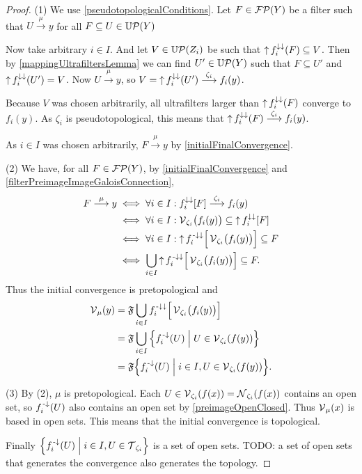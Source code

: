 \begin{proof}
(1) We use \ref{pseudotopologicalConditions}. Let $F\in\operatorname{\mathcal{FP}}(Y)$ be a filter such that $U\overset{\mu}{\longrightarrow} y$ for all $F\subseteq U\in\operatorname{\mathbb{U}\mathcal{P}}(Y)$ 

Now take arbitrary $i\in I$. And let $V\in\operatorname{\mathbb{U}\mathcal{P}}(Z_i)$ be such that $\operatorname{\uparrow} f_i^{\downarrow\downarrow}(F) \subseteq V$. Then by \ref{mappingUltrafiltersLemma} we can find $U'\in\operatorname{\mathbb{U}\mathcal{P}}(Y)$ such that $F\subseteq U'$ and $\operatorname{\uparrow} f_i^{\downarrow\downarrow}(U') = V$. Now $U\overset{\mu}{\longrightarrow} y$, so $V = \operatorname{\uparrow} f_i^{\downarrow\downarrow}(U') \overset{\zeta_i}{\longrightarrow} f_i(y)$. 

Because $V$ was chosen arbitrarily, all ultrafilters larger than $\operatorname{\uparrow} f_i^{\downarrow\downarrow}(F)$ converge to $f_i(y)$. As $\zeta_i$ is pseudotopological, this means that $\operatorname{\uparrow} f_i^{\downarrow\downarrow}(F) \overset{\zeta_i}{\longrightarrow} f_i(y)$.

As $i\in I$ was chosen arbitrarily, $F\overset{\mu}{\longrightarrow} y$ by \ref{initialFinalConvergence}.

(2) We have, for all $F\in \operatorname{\mathcal{FP}}(Y)$, by \ref{initialFinalConvergence} and \ref{filterPreimageImageGaloisConnection},
\begin{align*}
F \overset{\mu}{\longrightarrow} y &\iff \forall i\in I: f_i^{\downarrow\downarrow}[F] \overset{\zeta_i}{\longrightarrow} f_i(y) \\
&\iff \forall i\in I: \operatorname{\mathcal{V}}_{\zeta_i}\!\big(f_i(y)\big) \subseteq \operatorname{\uparrow} f_i^{\downarrow\downarrow}[F] \\
&\iff \forall i\in I: \operatorname{\uparrow} f_i^{{\text{\hspace{0.15em}-}\downarrow}\downarrow}\Big[\operatorname{\mathcal{V}}_{\zeta_i}\!\big(f_i(y)\big)\Big] \subseteq F \\
&\iff \bigcup_{i\in I} \operatorname{\uparrow} f_i^{{\text{\hspace{0.15em}-}\downarrow}\downarrow}\Big[\operatorname{\mathcal{V}}_{\zeta_i}\!\big(f_i(y)\big)\Big] \subseteq F.
\end{align*}
Thus the initial convergence is pretopological and
\begin{align*}
\vicinity_\mu(y) &= \mathfrak{F}\bigcup_{i\in I} f_i^{\preimf\imf}\Big[\vicinity_{\zeta_i}\!\big(f_i(y)\big)\Big] \\
&= \mathfrak{F}\bigcup_{i\in I}\setbuilder{f_i^\preimf(U)}{U\in \vicinity_{\zeta_i}(f(y))} \\
&= \mathfrak{F}\setbuilder{f_i^\preimf(U)}{i\in I, U\in \vicinity_{\zeta_i}(f(y))}.
\end{align*}

(3) By (2), $\mu$ is pretopological. Each $U\in \operatorname{\mathcal{V}}_{\zeta_i}(f(x)) = \operatorname{\mathcal{N}}_{\zeta_i}(f(x))$ contains an open set, so $f_i^{\text{\hspace{0.15em}-}\downarrow}(U)$ also contains an open set by \ref{preimageOpenClosed}. Thus $\operatorname{\mathcal{V}}_\mu(x)$ is based in open sets. This means that the initial convergence is topological.

Finally $\setbuilder{f_i^\preimf(U)}{i\in I, U\in \topology_{\zeta_i}}$ is a set of open sets. TODO: a set of open sets that generates the convergence also generates the topology.
\end{proof}


